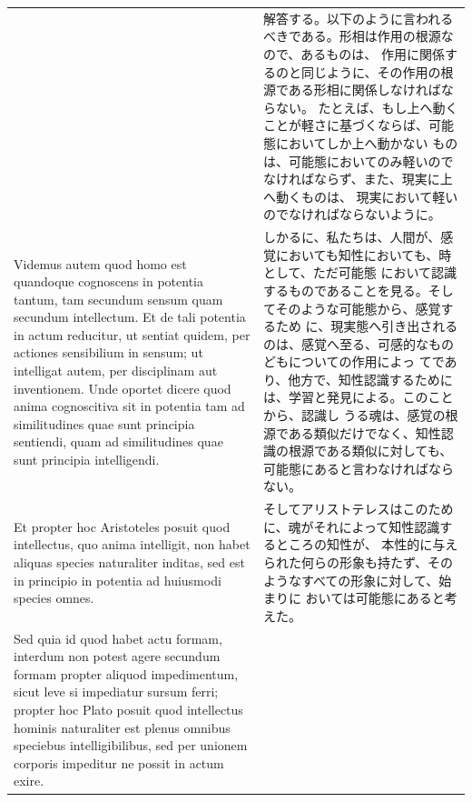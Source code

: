 \documentclass[paper=a4paper,fontsize=10pt,jafontsize=9pt,titlepage]{jlreq}
\begin{document}
\begin{longtable}{p{21em}p{21em}}
 
 &

 解答する。以下のように言われるべきである。形相は作用の根源なので、あるものは、
 作用に関係するのと同じように、その作用の根源である形相に関係しなければならない。
 たとえば、もし上へ動くことが軽さに基づくならば、可能態においてしか上へ動かない
 ものは、可能態においてのみ軽いのでなければならず、また、現実に上へ動くものは、
 現実において軽いのでなければならないように。

\\[1em]

 Videmus autem quod homo est quandoque cognoscens in potentia tantum, tam
 secundum sensum quam secundum intellectum. Et de tali potentia in actum
 reducitur, ut sentiat quidem, per actiones sensibilium in sensum; ut intelligat
 autem, per disciplinam aut inventionem. Unde oportet dicere quod anima
 cognoscitiva sit in potentia tam ad similitudines quae sunt principia
 sentiendi, quam ad similitudines quae sunt principia intelligendi.
 
 &

 しかるに、私たちは、人間が、感覚においても知性においても、時として、ただ可能態
 において認識するものであることを見る。そしてそのような可能態から、感覚するため
 に、現実態へ引き出されるのは、感覚へ至る、可感的なものどもについての作用によっ
 てであり、他方で、知性認識するためには、学習と発見による。このことから、認識し
 うる魂は、感覚の根源である類似だけでなく、知性認識の根源である類似に対しても、
 可能態にあると言わなければならない。
 
\\[1em]

 Et propter hoc Aristoteles posuit quod intellectus, quo anima intelligit, non
 habet aliquas species naturaliter inditas, sed est in principio in potentia ad
 huiusmodi species omnes.

 &

 そしてアリストテレスはこのために、魂がそれによって知性認識するところの知性が、
 本性的に与えられた何らの形象も持たず、そのようなすべての形象に対して、始まりに
 おいては可能態にあると考えた。

\\[1em]

 Sed quia id quod habet actu formam, interdum non potest agere secundum formam
 propter aliquod impedimentum, sicut leve si impediatur sursum ferri; propter
 hoc Plato posuit quod intellectus hominis naturaliter est plenus omnibus
 speciebus intelligibilibus, sed per unionem corporis impeditur ne possit in
 actum exire.
 
 &


\end{longtable}
\end{document}
